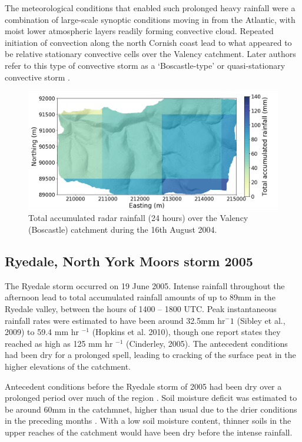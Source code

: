 The meteorological conditions that enabled such prolonged heavy rainfall were a combination of large-scale synoptic conditions moving in from the Atlantic, with moist lower atmospheric layers readily forming convective cloud. Repeated initiation of convection along the north Cornish coast lead to what appeared to be relative stationary convective cells over the Valency catchment. Later authors refer to this type of convective storm as a `Boscastle-type' or quasi-stationary convective storm \citep{warren2014boscastle}.

\begin{figure}[htb]
\includegraphics[width=15cm]{chp_events_figures_scripts/figure_boscastle_total_rainfall.png}
\caption{Total accumulated radar rainfall (24 hours) over the Valency (Boscastle) catchment during the 16th August 2004.}
\label{fig_boscastle_rain_totals}
\end{figure}


\subsection{Ryedale, North York Moors storm 2005}
The Ryedale storm occurred on 19 June 2005. Intense rainfall throughout the afternoon lead to total accumulated rainfall amounts of up to 89mm in the Ryedale valley, between the hours of 1400 -- 1800 UTC. Peak instantaneous rainfall rates were estimated to have been around 32.5mm hr\(^-1\) (Sibley et al., 2009) to 59.4 mm hr \(^{-1}\) (Hopkins et al. 2010), though one report states they reached as high as 125 mm hr \(^{-1}\) (Cinderley, 2005). The antecedent conditions had been dry for a prolonged spell, leading to cracking of the surface peat in the higher elevations of the catchment.

Antecedent conditions before the Ryedale storm of 2005 had been dry over a prolonged period over much of the region \citep{sibley2009analysis}. Soil moisture deficit was estimated to be around 60mm in the catchmnet, higher than usual due to the drier conditions in the preceding months \citep{wass2008investigation}. With a low soil moisture content, thinner soils in the upper reaches of the catchment would have been dry before the intense rainfall.

